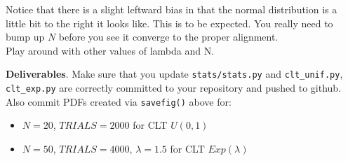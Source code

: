 \begin{fullwidth}
\noindent {} 

Notice that there is a slight leftward bias in that the normal distribution is a little bit to the right it looks like. This is to be expected. You really need to bump up $N$ before you see it converge to the proper alignment.\\

\step Play around with other values of lambda and N.

\begin{callout}{\bcplume}
{\bf Deliverables}. Make sure that you update {\tt stats/stats.py} and {\tt clt\_unif.py}, {\tt clt\_exp.py} are correctly committed to your repository and pushed to github. Also commit PDFs created via {\tt savefig()} above for:

\begin{itemize}
\item $N=20$, $TRIALS=2000$ for CLT $U(0,1)$ 
\item $N=50$, $TRIALS=4000$, $\lambda=1.5$ for CLT $Exp(\lambda)$ 
\end{itemize}
\end{callout}

\end{fullwidth}
